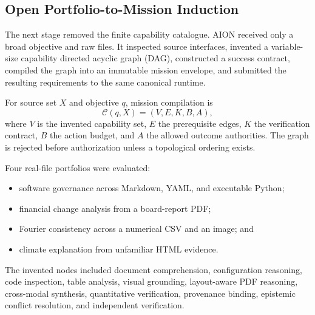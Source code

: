 \subsection{Open Portfolio-to-Mission Induction}

The next stage removed the finite capability catalogue.  AION received only a
broad objective and raw files.  It inspected source interfaces, invented a
variable-size capability directed acyclic graph (DAG), constructed a success
contract, compiled the graph into an immutable mission envelope, and submitted
the resulting requirements to the same canonical runtime.

For source set $X$ and objective $q$, mission compilation is
\begin{equation}
\mathcal{C}(q,X)
=\left(V,E,K,B,A\right),
\end{equation}
where $V$ is the invented capability set, $E$ the prerequisite edges, $K$ the
verification contract, $B$ the action budget, and $A$ the allowed outcome
authorities.  The graph is rejected before authorization unless a topological
ordering exists.

Four real-file portfolios were evaluated:
\begin{itemize}
    \item software governance across Markdown, YAML, and executable Python;
    \item financial change analysis from a board-report PDF;
    \item Fourier consistency across a numerical CSV and an image; and
    \item climate explanation from unfamiliar HTML evidence.
\end{itemize}
The invented nodes included document comprehension, configuration reasoning,
code inspection, table analysis, visual grounding, layout-aware PDF reasoning,
cross-modal synthesis, quantitative verification, provenance binding,
epistemic conflict resolution, and independent verification.

